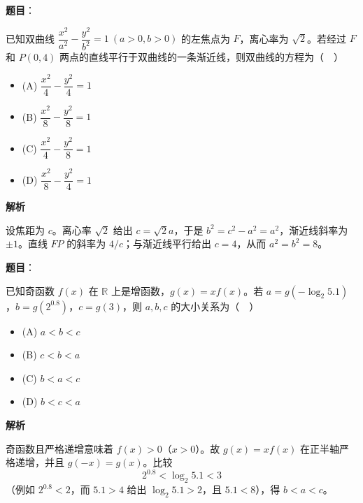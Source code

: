 \begin{answer}

\textbf{题目}：

已知双曲线 $\dfrac{x^2}{a^2}-\dfrac{y^2}{b^2}=1\ (a>0,b>0)$ 的左焦点为 $F$，离心率为 $\sqrt2$。若经过 $F$ 和 $P(0,4)$ 两点的直线平行于双曲线的一条渐近线，则双曲线的方程为（　）

\begin{itemize}
\item (A) $\dfrac{x^2}{4}-\dfrac{y^2}{4}=1$
\item (B) $\dfrac{x^2}{8}-\dfrac{y^2}{8}=1$
\item (C) $\dfrac{x^2}{4}-\dfrac{y^2}{8}=1$
\item (D) $\dfrac{x^2}{8}-\dfrac{y^2}{4}=1$
\end{itemize}

\textbf{解析}

设焦距为 $c$。离心率 $\sqrt2$ 给出 $c=\sqrt2a$，于是 $b^2=c^2-a^2=a^2$，渐近线斜率为 $\pm1$。直线 $FP$ 的斜率为 $4/c$；与渐近线平行给出 $c=4$，从而 $a^2=b^2=8$。


\end{answer}
\begin{answer}

\textbf{题目}：

已知奇函数 $f(x)$ 在 $\mathbb R$ 上是增函数，$g(x)=xf(x)$。若 $a=g(-\log_2 5.1)$，$b=g(2^{0.8})$，$c=g(3)$，则 $a,b,c$ 的大小关系为（　）

\begin{itemize}
\item (A) $a<b<c$
\item (B) $c<b<a$
\item (C) $b<a<c$
\item (D) $b<c<a$
\end{itemize}

\textbf{解析}

奇函数且严格递增意味着 $f(x)>0$（$x>0$）。故 $g(x)=xf(x)$ 在正半轴严格递增，并且 $g(-x)=g(x)$。比较
\nopagebreak[4]
\[
2^{0.8}<\log_2 5.1<3
\]
（例如 $2^{0.8}<2$，而 $5.1>4$ 给出 $\log_2 5.1>2$，且 $5.1<8$），得 $b<a<c$。


\end{answer}
